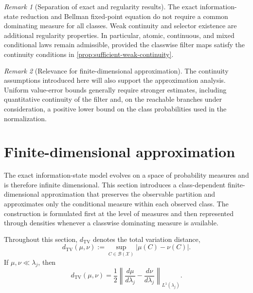 \documentclass[10pt,twocolumn]{article}
\theoremstyle{remark}
\newtheorem{remark}{Remark}
\newcommand{\B}{\mathcal{B}}
\newcommand{\Xcal}{\mathcal{X}}
\begin{document}
\begin{remark}[Separation of exact and regularity results]
	\label{rem:exact-versus-regularity}
	The exact information-state reduction and Bellman fixed-point equation do not require a common dominating measure for all classes. Weak continuity and selector existence are additional regularity properties. In particular, atomic, continuous, and mixed conditional laws remain admissible, provided the classwise filter maps satisfy the continuity conditions in \cref{prop:sufficient-weak-continuity}.
\end{remark}

\begin{remark}[Relevance for finite-dimensional approximation]
	\label{rem:weak-continuity-approximation}
	The continuity assumptions introduced here will also support the approximation analysis. Uniform value-error bounds generally require stronger estimates, including quantitative continuity of the filter and, on the reachable branches under consideration, a positive lower bound on the class probabilities used in the normalization.
\end{remark}


%
%

\section{Finite-dimensional approximation}
\label{sec:finite-dimensional-approximation}

The exact information-state model evolves on a space of probability measures and is therefore infinite dimensional. This section introduces a class-dependent finite-dimensional approximation that preserves the observable partition and approximates only the conditional measure within each observed class. The construction is formulated first at the level of measures and then represented through densities whenever a classwise dominating measure is available.

Throughout this section, \(d_{\mathrm{TV}}\) denotes the total variation distance,
\begin{equation}
	d_{\mathrm{TV}}(\mu,\nu)
	:=
	\sup_{C\in\B(\Xcal)}
	|\mu(C)-\nu(C)|.
	\label{eq:tv-distance}
\end{equation}
If \(\mu,\nu\ll\lambda_j\), then
\begin{equation*}
	d_{\mathrm{TV}}(\mu,\nu)
	=
	\frac12
	\left\|
	\frac{d\mu}{d\lambda_j}
	-
	\frac{d\nu}{d\lambda_j}
	\right\|_{L^1(\lambda_j)}.
	\label{eq:tv-l1-equivalence}
\end{equation*}
\end{document}

